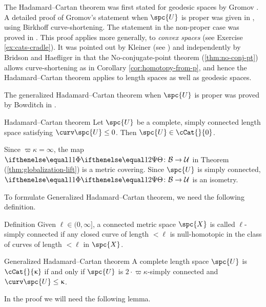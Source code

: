 The Hadamard--Cartan theorem was first stated for geodesic spaces by Gromov  \cite[p.119]{gromov:hyp-groups}. 
A detailed proof of Gromov's statement when $\spc{U}$ is proper  was given in \cite{ballmann:cartan-hadamard}, using Birkhoff curve-shortening.  
The statement in the non-proper  case was proved in \cite{a-b:h-c}.  This proof applies more generally, to \emph{convex spaces} (see Exercise \ref{ex:cats-cradle}).
It was pointed out by %
Kleiner (see \cite{ballmann:notes,ballmann:lectures}) 
and independently by %
Bridson and %
Haefliger in \cite{BH} that the No-conjugate-point theorem (\ref{thm:no-conj-pt}) allows curve-shortening as in Corollary \ref{cor:homotopy-from-p}, and hence the Hadamard--Cartan theorem applies to length spaces as well as geodesic spaces.

The generalized Hadamard--Cartan theorem
 when $\spc{U}$ is proper was proved by Bowditch in \cite{bowditch}.

\begin{thm}{Hadamard--Cartan theorem}
\label{thm:hadamard-cartan}
Let $\spc{U}$ be a complete,  simply connected length space satisfying $\curv\spc{U}\le 0$.
Then $\spc{U}\in\cCat{}{0}$.
\end{thm}

 Since $\varpi\kappa=\infty$,
the map $\map\:\spc{B}\to\spc{U}$ in Theorem
 (\ref{thm:globalization-lift}) is a metric covering. 
Since $\spc{U}$ is simply connected, $\map\:\spc{B}\to\spc{U}$ is an isometry.
\qeds

To formulate Generalized Hadamard--Cartan theorem,
we need the following definition.

\begin{thm}{Definition}\label{def:l-s.c.}
Given $\ell\in (0,\infty]$,
a connected metric space $\spc{X}$ is called 
$\ell$-simply connected if any closed curve of length $<\ell$ is null-homotopic in the class of curves of length $<\ell$ in $\spc{X}$.
\end{thm}

\begin{thm}{Generalized Hadamard--Cartan theorem}\label{thm:hadamard-cartan-gen}
A complete length space
$\spc{U}$ is $\cCat{}{\kappa}$ 
if and only if $\spc{U}$ is $2\cdot\varpi\kappa$-simply connected
and $\curv\spc{U}\le\kappa$.
\end{thm}

In the proof we will need the following lemma.

